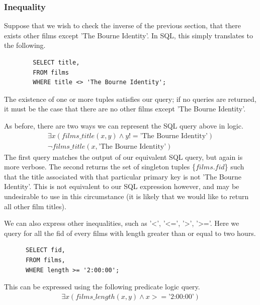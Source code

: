 \documentclass[a4paper, 11pt]{article}
\begin{document}
    \subsubsection{Inequality}

      Suppose that we wish to check the inverse of the previous section, that
      there exists other films except 'The Bourne Identity'. In SQL, this
      simply translates to the following.

      \begin{verbatim}
        SELECT title,
        FROM films
        WHERE title <> 'The Bourne Identity';
      \end{verbatim}

      The existence of one or more tuples satisfies our query; if no queries
      are returned, it must be the case that there are no other films except
      'The Bourne Identity'.

      As before, there are two ways we can represent the SQL query above in
      logic.
      \begin{gather}
        \exists x(films\_title(x, y) \land y !=  \text{'The Bourne
        Identity'})\label{where3}\\
        \lnot films\_title(x, \text{'The Bourne Identity'})\label{where4}
      \end{gather}
      The first query matches the output of our equivalent SQL query, but again
      is more verbose. The second returns the set of singleton tuples
      \{$films.fid$\} such that the title associated with that particular
      primary key is not 'The Bourne Identity'. This is not equivalent to our
      SQL expression however, and may be undesirable to use in this
      circumstance (it is likely that we would like to return all other film
      titles).


      We can also express other inequalities, such as '<', '<=', '>', '>='.
      Here we query for all the fid of every films with length greater than or
      equal to two hours.

      \begin{verbatim}
      SELECT fid,
      FROM films,
      WHERE length >= '2:00:00';
      \end{verbatim}

      This can be expressed using the following predicate logic query.
      \begin{gather}
        \exists x(films\_length(x, y) \land x >= \text{'2:00:00'}) \label{where5}
      \end{gather}
\end{document}
